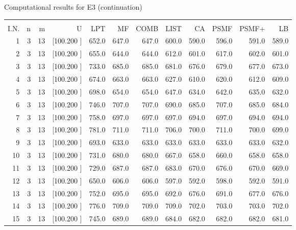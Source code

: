 \documentclass[12pt,a4paper]{article}
\begin{document}
\newpage
\begin{center}
 Computational results for E3 (continuation) {\tiny
\begin{tabular}{r r r r r r r r r r r r}\hline
    &   &   &          &        &        &        &        &        &        &        &       \\[-0.1in]
  I.N.  &  n  &  m  &  U  &  LPT  &  MF  &  COMB  &  LIST  &  CA  & PSMF &PSMF+ & LB \\[0.03in]
\hline
   1&  3& 13&[100.200   ]&   652.0&   647.0&   647.0&   600.0&   590.0&   596.0&   591.0&   589.0\\[-0.02in]
   2&  3& 13&[100.200   ]&   655.0&   644.0&   644.0&   612.0&   601.0&   617.0&   602.0&   601.0\\[-0.02in]
   3&  3& 13&[100.200   ]&   733.0&   685.0&   685.0&   681.0&   676.0&   679.0&   677.0&   673.0\\[-0.02in]
   4&  3& 13&[100.200   ]&   674.0&   663.0&   663.0&   627.0&   610.0&   620.0&   612.0&   609.0\\[-0.02in]
   5&  3& 13&[100.200   ]&   698.0&   654.0&   654.0&   647.0&   634.0&   642.0&   635.0&   632.0\\[-0.02in]
   6&  3& 13&[100.200   ]&   746.0&   707.0&   707.0&   690.0&   685.0&   707.0&   685.0&   684.0\\[-0.02in]
   7&  3& 13&[100.200   ]&   758.0&   697.0&   697.0&   697.0&   694.0&   697.0&   694.0&   694.0\\[-0.02in]
   8&  3& 13&[100.200   ]&   781.0&   711.0&   711.0&   706.0&   700.0&   711.0&   700.0&   699.0\\[-0.02in]
   9&  3& 13&[100.200   ]&   693.0&   633.0&   633.0&   633.0&   633.0&   633.0&   633.0&   632.0\\[-0.02in]
  10&  3& 13&[100.200   ]&   731.0&   680.0&   680.0&   667.0&   658.0&   660.0&   658.0&   658.0\\[-0.02in]
  11&  3& 13&[100.200   ]&   729.0&   687.0&   687.0&   683.0&   670.0&   676.0&   670.0&   669.0\\[-0.02in]
  12&  3& 13&[100.200   ]&   650.0&   606.0&   606.0&   597.0&   592.0&   598.0&   592.0&   591.0\\[-0.02in]
  13&  3& 13&[100.200   ]&   752.0&   695.0&   695.0&   692.0&   676.0&   691.0&   677.0&   676.0\\[-0.02in]
  14&  3& 13&[100.200   ]&   776.0&   709.0&   709.0&   709.0&   702.0&   703.0&   703.0&   702.0\\[-0.02in]
  15&  3& 13&[100.200   ]&   745.0&   689.0&   689.0&   684.0&   682.0&   682.0&   682.0&   681.0\\[-0.02in]

\end{tabular}}
\end{center}
\end{document}
